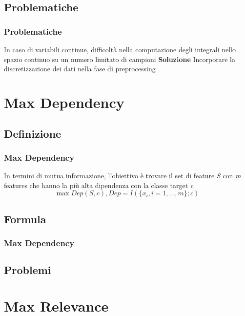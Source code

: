 \documentclass{beamer}
\begin{document}
\subsection{Problematiche}
\begin{frame}
	\frametitle{Problematiche}
	In caso di variabili continue, difficoltà nella computazione degli integrali nello spazio continuo su un numero limitato di campioni\newline\newline
	\textbf{Soluzione}\newline\newline
	Incorporare la discretizzazione dei dati nella fase di preprocessing
\end{frame}


\section{Max Dependency}
\subsection{Definizione}
\begin{frame}
	\frametitle{Max Dependency}
	In termini di mutua informazione, l'obiettivo è trovare il set di feature \emph{S} con \emph{m} features che hanno la più alta dipendenza con la classe target \emph{c}
	$$ \max Dep(S,c), Dep = I(\{x_i,i=1,\dots,m \};c )$$
\end{frame}

\subsection{Formula}
\begin{frame}
	\frametitle{Max Dependency}

	

\end{frame}
\subsection{Problemi}
\begin{frame}
	
\end{frame}


\section{Max Relevance}
\end{document}
